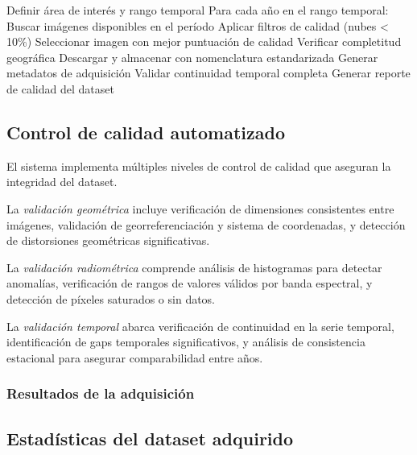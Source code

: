 \begin{algorithm}
\caption{Protocolo de adquisición automatizada}
\begin{algorithmic}[1]
\STATE Definir área de interés y rango temporal
\STATE Para cada año en el rango temporal:
	\STATE \quad Buscar imágenes disponibles en el período
	\STATE \quad Aplicar filtros de calidad (nubes < 10\%)
	\STATE \quad Seleccionar imagen con mejor puntuación de calidad
	\STATE \quad Verificar completitud geográfica
	\STATE \quad Descargar y almacenar con nomenclatura estandarizada
	\STATE \quad Generar metadatos de adquisición
\STATE Validar continuidad temporal completa
\STATE Generar reporte de calidad del dataset
\end{algorithmic}
\end{algorithm}

\subsection{Control de calidad automatizado}

El sistema implementa múltiples niveles de control de calidad que aseguran la integridad del dataset.

La \textit{validación geométrica} incluye verificación de dimensiones consistentes entre imágenes, validación de georreferenciación y sistema de coordenadas, y detección de distorsiones geométricas significativas.

La \textit{validación radiométrica} comprende análisis de histogramas para detectar anomalías, verificación de rangos de valores válidos por banda espectral, y detección de píxeles saturados o sin datos.

La \textit{validación temporal} abarca verificación de continuidad en la serie temporal, identificación de gaps temporales significativos, y análisis de consistencia estacional para asegurar comparabilidad entre años.

\subsubsection{Resultados de la adquisición}

\subsection{Estadísticas del dataset adquirido}

